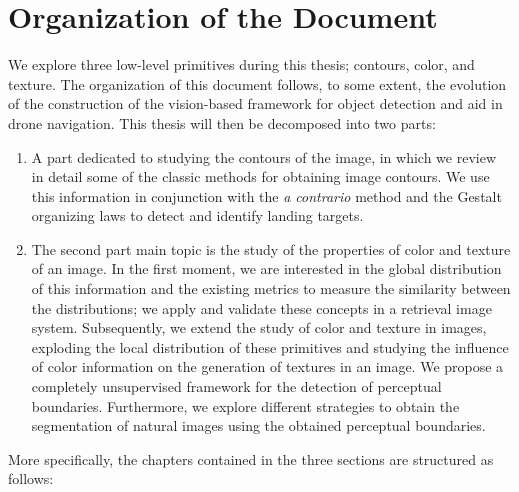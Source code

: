 \section*{Organization of the Document}
We explore three low-level primitives during this thesis; contours, color, and texture. The organization of this document follows, to some extent, the evolution of the construction of the vision-based framework for object detection and aid in drone navigation. This thesis will then be decomposed into two parts:

\begin{enumerate}
	\item A part dedicated to studying the contours of the image, in which we review in detail some of the classic methods for obtaining image contours. We use this information in conjunction with the \textit{a contrario} method and the Gestalt organizing laws to detect and identify landing targets.
	\item The second part main topic is the study of the properties of color and texture of an image. In the first moment, we are interested in the global distribution of this information and the existing metrics to measure the similarity between the distributions; we apply and validate these concepts in a retrieval image system. Subsequently, we extend the study of color and texture in images, exploding the local distribution of these primitives and studying the influence of color information on the generation of textures in an image. We propose a completely unsupervised framework for the detection of perceptual boundaries. Furthermore, we explore different strategies to obtain the segmentation of natural images using the obtained perceptual boundaries.
\end{enumerate}

More specifically, the chapters contained in the three sections are structured as follows:

